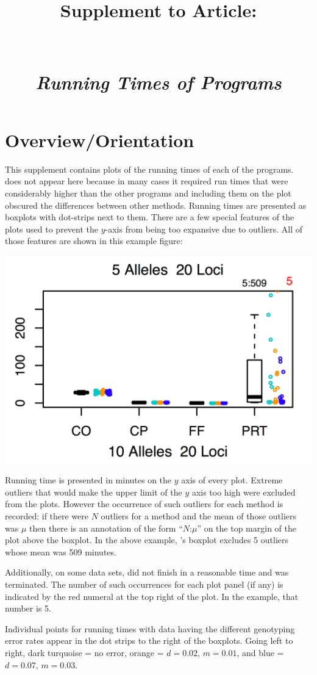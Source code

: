 \documentclass[11pt,landscape]{report}
\title{Supplement \SupNum{} to Article:\\
\ArticleName\\
\mbox{}\\
{\em Running Times of Programs}}
\begin{document}
\maketitle
\section{Overview/Orientation}
This supplement contains plots of the running times of each of the programs. \kinalyzer{} does not appear here because in many cases it required run times that were considerably higher than the other programs and including them on the plot obscured the differences between other methods. 
Running times are presented as boxplots with dot-strips next to them.  There are a few special features of the plots used to prevent the $y$-axis from being too expansive due to outliers.   All of those features are shown in this example figure: 
\begin{center}
\includegraphics[width=.4\textwidth]{suppl4_example_noki.png}
\end{center}
Running time is presented in minutes on the $y$ axis of every plot.  Extreme outliers that would make the upper limit of the $y$ axis too high were excluded from the plots.  However the occurrence of such outliers for each method is recorded: if there were $N$ outliers for a method and the mean of those outliers was $\mu$ then there is an annotation of the form  ``$N$:$\mu$'' on the top margin of the plot above the boxplot.  In the above example, \prt{}'s boxplot excludes 5 outliers whose mean was 509 minutes.

Additionally, on some data sets, \prt{} did not finish in a reasonable time and was terminated.  The number of such occurrences for each plot panel (if any) is indicated by the red numeral at the top right of the plot.  In the example, that number is 5.

Individual points for running times with data having the different genotyping error rates appear in the dot strips to the right of the boxplots.  Going left to right, dark turquoise =  no error, orange = $d=0.02$, $m=0.01$, and blue = $d=0.07$, $m=0.03$.
\end{document}
